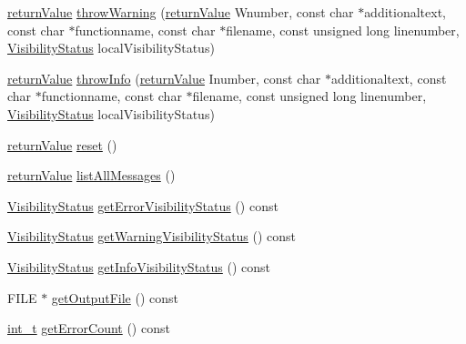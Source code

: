 \begin{DoxyCompactItemize}
\item 
\hyperlink{_message_handling_8hpp_a81d556f613bfbabd0b1f9488c0fa865e}{return\+Value} \hyperlink{class_message_handling_a20916177fb0e5a55e1cc74df22e53795}{throw\+Warning} (\hyperlink{_message_handling_8hpp_a81d556f613bfbabd0b1f9488c0fa865e}{return\+Value} Wnumber, const char $\ast$additionaltext, const char $\ast$functionname, const char $\ast$filename, const unsigned long linenumber, \hyperlink{_types_8hpp_a36503475bb1fea0a7fd7087259ee63c1}{Visibility\+Status} local\+Visibility\+Status)
\item 
\hyperlink{_message_handling_8hpp_a81d556f613bfbabd0b1f9488c0fa865e}{return\+Value} \hyperlink{class_message_handling_a57fafea776d1d7be7a36676a7396aabe}{throw\+Info} (\hyperlink{_message_handling_8hpp_a81d556f613bfbabd0b1f9488c0fa865e}{return\+Value} Inumber, const char $\ast$additionaltext, const char $\ast$functionname, const char $\ast$filename, const unsigned long linenumber, \hyperlink{_types_8hpp_a36503475bb1fea0a7fd7087259ee63c1}{Visibility\+Status} local\+Visibility\+Status)
\item 
\hyperlink{_message_handling_8hpp_a81d556f613bfbabd0b1f9488c0fa865e}{return\+Value} \hyperlink{class_message_handling_aee146336fc1d08ae20ea00498aee471f}{reset} ()
\item 
\hyperlink{_message_handling_8hpp_a81d556f613bfbabd0b1f9488c0fa865e}{return\+Value} \hyperlink{class_message_handling_a8b6ff3603352ace1322188f156983c44}{list\+All\+Messages} ()
\item 
\hyperlink{_types_8hpp_a36503475bb1fea0a7fd7087259ee63c1}{Visibility\+Status} \hyperlink{class_message_handling_abc5f45b51ceae367c1bb1f387e6df28b}{get\+Error\+Visibility\+Status} () const
\item 
\hyperlink{_types_8hpp_a36503475bb1fea0a7fd7087259ee63c1}{Visibility\+Status} \hyperlink{class_message_handling_abb3b7874c8c06e9ddefcc7dfa3aa739e}{get\+Warning\+Visibility\+Status} () const
\item 
\hyperlink{_types_8hpp_a36503475bb1fea0a7fd7087259ee63c1}{Visibility\+Status} \hyperlink{class_message_handling_a419e09147087d5999a73dde7ec815beb}{get\+Info\+Visibility\+Status} () const
\item 
F\+I\+LE $\ast$ \hyperlink{class_message_handling_a6c79ada9dcfed04df8cdda3b9368f38c}{get\+Output\+File} () const
\item 
\hyperlink{_types_8hpp_ab6fd6105e64ed14a0c9281326f05e623}{int\+\_\+t} \hyperlink{class_message_handling_a9b0fcad01661054a8de3c5d4c0da2c18}{get\+Error\+Count} () const
\item 

\end{DoxyCompactItemize}
